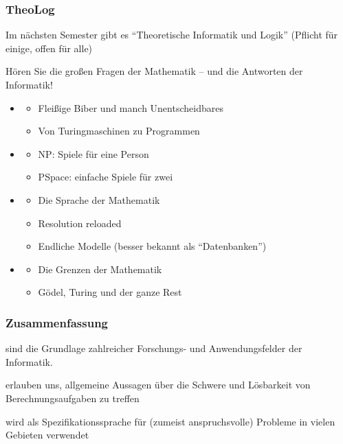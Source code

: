 \documentclass[aspectratio=1610,onlymath]{beamer}
\begin{document}
\begin{frame}\frametitle{TheoLog}

Im nächsten Semester gibt es \alert{"`Theoretische Informatik und Logik"'} {\tiny(Pflicht für einige, offen für alle)}\medskip

Hören Sie die großen Fragen der Mathematik -- und die Antworten der Informatik!
\begin{itemize}
\item {}
\begin{itemize}
\item Fleißige Biber und manch Unentscheidbares
\item Von Turingmaschinen zu Programmen
\end{itemize}
\item {}
\begin{itemize}
\item NP: Spiele für eine Person
\item PSpace: einfache Spiele für zwei
\end{itemize}
\item {}
\begin{itemize}
\item Die Sprache der Mathematik
\item Resolution reloaded
\item Endliche Modelle (besser bekannt als ``Datenbanken'')
\end{itemize}
\item {}
\begin{itemize}
\item Die Grenzen der Mathematik
\item Gödel, Turing und der ganze Rest
\end{itemize}
\end{itemize}

\end{frame}


\begin{frame}\frametitle{Zusammenfassung}

 sind die Grundlage zahlreicher Forschungs- und Anwendungsfelder der Informatik.
\bigskip

 erlauben uns, allgemeine Aussagen über die Schwere und Lösbarkeit
von Berechnungsaufgaben zu treffen
\bigskip

 wird als Spezifikationssprache für (zumeist anspruchsvolle) Probleme in vielen Gebieten verwendet
\bigskip



\end{frame}
\end{document}
